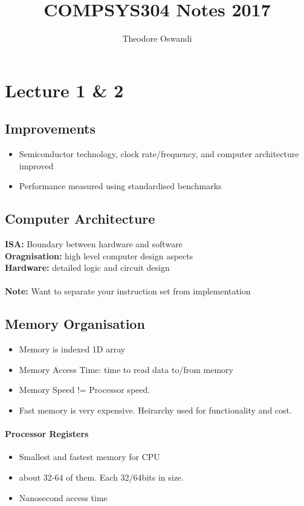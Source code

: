\documentclass{article}
\title{COMPSYS304 Notes 2017}
\author{Theodore Oswandi}
\newcommand\tab[1][0.5cm]{\hspace*{#1}}
\begin{document}
 \maketitle{} 

\section{Lecture 1 \& 2}
	\subsection*{Improvements}
		\begin{itemize}
			\item Semiconductor technology, clock rate/frequency, and computer architecture improved
			\item Performance measured using standardised benchmarks
		\end{itemize}

	\subsection*{Computer Architecture}
		\textbf{\tab ISA:} Boundary between hardware and software\\
		\textbf{\tab Oragnisation:} high level computer design aspects\\
		\textbf{\tab Hardware:} detailed logic and circuit design
		\\ \\
		\textbf{\tab Note:} Want to separate your instruction set from implementation

	\subsection*{Memory Organisation}
		\begin{itemize}
			\item Memory is indexed 1D array
			\item Memory Access Time: time to read data to/from memory \\ 
			\item Memory Speed != Processor speed.
			\item Fast memory is very expensive. Heirarchy used for functionality and cost.
		\end{itemize}

		\paragraph{\tab Processor Registers}
		\begin{itemize}
			\item Smallest and fastest memory for CPU
			\item about 32-64 of them. Each 32/64bits in size.
			\item Nanosecond access time
		\end{itemize}
\end{document}
